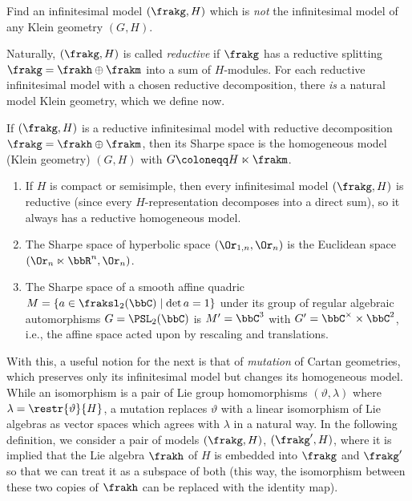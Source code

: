 \begin{xca}
    Find an infinitesimal model $(\frakg,H)$ which is \emph{not} the infinitesimal model of any Klein geometry $(G,H)$.
\end{xca}

Naturally, $(\frakg,H)$ is called \emph{reductive} if $\frakg$ has a reductive splitting $\frakg=\frakh\oplus\frakm$ into a sum of $H$-modules. For each reductive infinitesimal model with a chosen reductive decomposition, there \emph{is} a natural model Klein geometry, which we define now.

\begin{defn}
    If $(\frakg,H)$ is a reductive infinitesimal model with reductive decomposition $\frakg=\frakh\oplus\frakm$, then its Sharpe space is the homogeneous model (Klein geometry) $(G,H)$ with $G\coloneqq H\ltimes\frakm$.
\end{defn}

\begin{example}
    \begin{enumerate}
        \item If $H$ is compact or semisimple, then every infinitesimal model $(\frakg,H)$ is reductive (since every $H$-representation decomposes into a direct sum), so it always has a reductive homogeneous model.
        \item The Sharpe space of hyperbolic space $(\Or_{1,n},\Or_n)$ is the Euclidean space $(\Or_{n}\ltimes\bbR^n,\Or_n)$.
        \item The Sharpe space of a smooth affine quadric $M=\{a\in \fraksl_{2}(\bbC)\mid \det a=1\}$ under its group of regular algebraic automorphisms $G=\PSL_2(\bbC)$ is $M'=\bbC^3$ with $G'=\bbC^\times\times\bbC^2$, i.e., the affine space acted upon by rescaling and translations.
    \end{enumerate}
\end{example}


With this, a useful notion for the next \sect is that of \emph{mutation} of Cartan geometries, which preserves only its infinitesimal model but changes its homogeneous model. While an isomorphism is a pair of Lie group homomorphisms $(\vartheta,\lambda)$ where $\lambda=\restr{\vartheta}{H}$, a mutation replaces $\vartheta$ with a linear isomorphism of Lie algebras as vector spaces which agrees with $\lambda$ in a natural way.  In the following definition, we consider a pair of models $(\frakg,H)$, $(\frakg',H)$, where it is implied that the Lie algebra $\frakh$ of $H$ is embedded into $\frakg$ and $\frakg'$ so that we can treat it as a subspace of both (this way, the isomorphism between these two copies of $\frakh$ can be replaced with the identity map).

